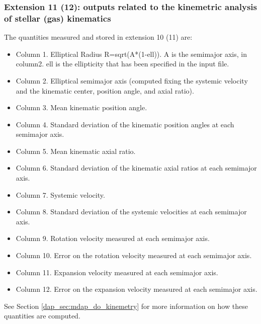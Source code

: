 \subsubsection{Extension 11 (12): outputs related to the kinemetric analysis of stellar (gas) kinematics}
The quantities measured and stored in extension 10 (11) are:
\begin{itemize}
\item Column 1. Elliptical Radius R=sqrt(A*(1-ell)). A is the semimajor axis, in column2. ell is the ellipticity that has been specified in the input file.
\item Column 2. Elliptical semimajor axis (computed fixing the systemic velocity and the kinematic center, position angle, and axial ratio).
\item Column 3. Mean kinematic position angle.
\item Column 4. Standard deviation of the kinematic position angles at each semimajor axis.
\item Column 5. Mean kinematic axial ratio.
\item Column 6. Standard deviation of the kinematic axial ratios at each semimajor axis.
\item Column 7. Systemic velocity.
\item Column 8. Standard deviation of the systemic velocities at each semimajor axis.
\item Column 9. Rotation velocity measured at each semimajor axis.
\item Column 10. Error on the rotation velocity measured at each semimajor axis.
\item Column 11. Expansion velocity measured at each semimajor axis.
\item Column 12. Error on the expansion velocity measured at each semimajor axis.

\end{itemize}



See Section \ref{dap_sec:mdap_do_kinemetry} for more information on how these quantities are computed.

